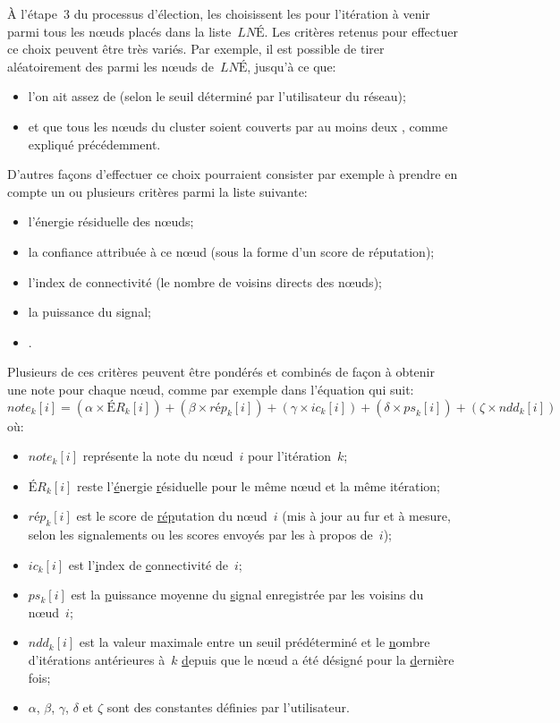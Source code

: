 À l'étape~3 du processus d'élection, les \chs choisissent les \cns pour l'itération à venir parmi tous les nœuds placés dans la liste~$\mathit{LNÉ}$.
Les critères retenus pour effectuer ce choix peuvent être très variés.
Par exemple, il est possible de tirer aléatoirement des \cns parmi les nœuds de~$\mathit{LNÉ}$, jusqu'à ce que:
\begin{itemize}
    \item l'on ait assez de \cns (selon le seuil déterminé par l'utilisateur du réseau);
    \item et que tous les nœuds du cluster soient couverts par au moins deux \cns, comme expliqué précédemment.
\end{itemize}
D'autres façons d'effectuer ce choix pourraient consister par exemple à prendre en compte un ou plusieurs critères parmi la liste suivante:
\begin{itemize}
    \item l'énergie résiduelle des nœuds;
    \item la confiance attribuée à ce nœud (sous la forme d'un score de réputation);
    \item l'index de connectivité (le nombre de voisins directs des nœuds);
    \item la puissance du signal;
    \item \etc.
\end{itemize}
Plusieurs de ces critères peuvent être pondérés et combinés de façon à obtenir une note pour chaque nœud, comme par exemple dans l'équation qui suit:%
\begin{equation*}
    \label{se:eqn:score}
    \mathit{note}_k[i] = (\alpha \times \mathit{ÉR}_k[i]) + (\beta \times \mathit{rép}_k[i]) + (\gamma \times \mathit{ic}_k[i]) + (\delta \times \mathit{ps}_k[i]) + (\zeta \times \mathit{ndd}_k[i])
\end{equation*}
où:
\begin{itemize}
    \item $\mathit{note}_k[i]$ représente la note du nœud~$i$ pour l'itération~$k$;
    \item $\mathit{ÉR}_k[i]$ reste l'\underline{é}nergie \underline{r}ésiduelle pour le même nœud et la même itération;
    \item $\mathit{rép}_k[i]$ est le score de \underline{rép}utation du nœud~$i$ (mis à jour au fur et à mesure, selon les signalements ou les scores envoyés par les \cns à propos de~$i$);
    \item $\mathit{ic}_k[i]$ est l'\underline{i}ndex de \underline{c}onnectivité de~$i$;
    \item $ps_k[i]$ est la \underline{p}uissance moyenne du \underline{s}ignal enregistrée par les voisins du nœud~$i$;
    \item $ndd_k[i]$ est la valeur maximale entre un seuil prédéterminé et le \underline{n}ombre d'itérations antérieures à~$k$ \underline{d}epuis que le nœud a été désigné \cn pour la \underline{d}ernière fois;
    \item $\alpha$, $\beta$, $\gamma$, $\delta$ et $\zeta$ sont des constantes définies par l'utilisateur.
\end{itemize}
